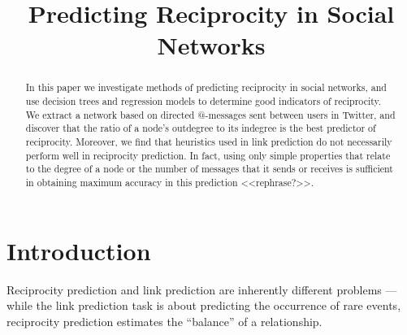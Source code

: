 \documentclass[conference]{IEEEtran}
\begin{document}
\title{Predicting Reciprocity in Social Networks}

\author{
\and
{}
\and
{}
}

\maketitle

\begin{abstract}
In this paper we investigate methods of predicting reciprocity in social networks, and use decision trees and regression models to determine good indicators of reciprocity. 
We extract a network based on directed @-messages sent between users in Twitter, and discover that the ratio of a node's outdegree to its indegree is the best predictor of reciprocity.  
Moreover, we find that heuristics used in link prediction do not necessarily perform well in reciprocity prediction. 
In fact, using only simple properties that relate to the degree of a node or the number of messages that it sends or receives is sufficient in obtaining maximum accuracy in this prediction <<rephrase?>>.
\end{abstract}


%
\IEEEpeerreviewmaketitle

\section{Introduction}
Reciprocity prediction and link prediction are inherently different problems --- while the link prediction task is about predicting the occurrence of rare events, reciprocity prediction estimates the ``balance'' of a relationship.
\end{document}
